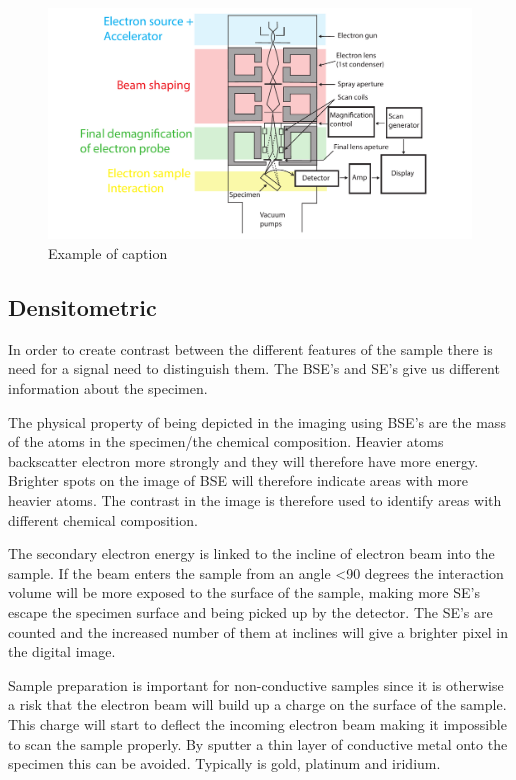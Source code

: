 \begin{figure}[ht!]
\centering
\includegraphics[width=120mm]{figures/Electron_microscopy.pdf}
\caption{Example of caption}
\label{fig:example}
\end{figure}


\subsection{Densitometric}
In order to create contrast between the different features of the sample there is need for a signal need to distinguish them. The BSE's and SE's give us different information about the specimen.

The physical property of being depicted in the imaging using BSE's are the mass of the atoms in the specimen/the chemical composition. Heavier atoms backscatter electron more strongly and they will therefore have more energy. Brighter spots on the image of BSE will therefore indicate areas with more heavier atoms. The contrast in the image is therefore used to identify areas with different chemical composition.

The secondary electron energy is linked to the incline of electron beam into the sample. If the beam enters the sample from an angle <90 degrees the interaction volume will be more exposed to the surface of the sample, making more SE's escape the specimen surface and being picked up by the detector. The SE's are counted and the increased number of them at inclines will give a brighter pixel in the digital image. 

Sample preparation is important for non-conductive samples since it is otherwise a risk that the electron beam will build up a charge on the surface of the sample. This charge will start to deflect the incoming electron beam making it impossible to scan the sample properly. By sputter a thin layer of conductive metal onto the specimen this can be avoided. Typically is gold, platinum and iridium. 

